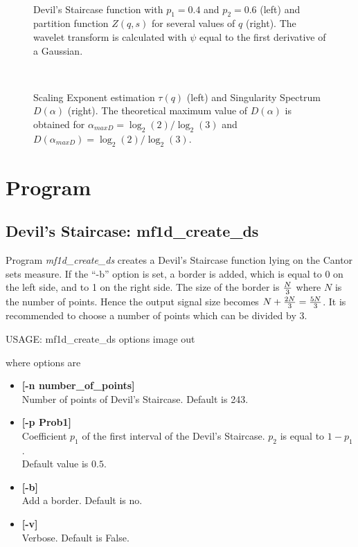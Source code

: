 \begin{figure}[htb]
\centerline{
\hbox{
}}
\caption{Devil's Staircase function with $p_1=0.4$ and $p_2=0.6$
(left) and partition function $Z(q,s)$ for several values of $q$ (right). 
The wavelet transform is calculated
with $\psi$ equal to the first derivative of a Gaussian.}
\label{fig_7} 
\end{figure}



\begin{figure}[htb]
\centerline{
\hbox{
}}
\caption{Scaling Exponent estimation $\tau(q)$ (left) and Singularity
Spectrum $D(\alpha)$ (right). The theoretical maximum value of $D(\alpha)$ is
obtained for $\alpha_{max D}=\log_2(2)/\log_2(3)$ and
$D(\alpha_{max D})=\log_2(2)/\log_2(3)$.}
\label{fig_8}
\end{figure}


\newpage
\section{Program}
\subsection{Devil's Staircase: mf1d\_create\_ds}
Program {\em mf1d\_create\_ds} creates a Devil's Staircase function lying on the
Cantor sets measure. If the ``-b'' option is set, a border is added, which
is equal to 0 on the left side, and to 1 on the right side. The size of the
border is ${N\over 3}$ where $N$ is the number of points. Hence the output
signal size becomes $N + {2N\over 3} = {5N\over 3}$. It is recommended to
choose a number of points which can be divided by 3.

{\bf
\begin{center}
USAGE:  mf1d\_create\_ds options image out
\end{center}}
where options are 
\begin{itemize}
\item {\bf [-n number\_of\_points]} \\
Number of points of Devil's Staircase. Default is 243.
\item {\bf [-p Prob1]} \\
Coefficient $p_1$ of the first interval of the Devil's Staircase. 
$p_2$ is equal to $1 - p_1$. \\
Default value is $0.5$. 
\item {\bf [-b]} \\
Add a border. Default is no.
\item {\bf [-v]} \\
Verbose. Default is False.
\end{itemize}
